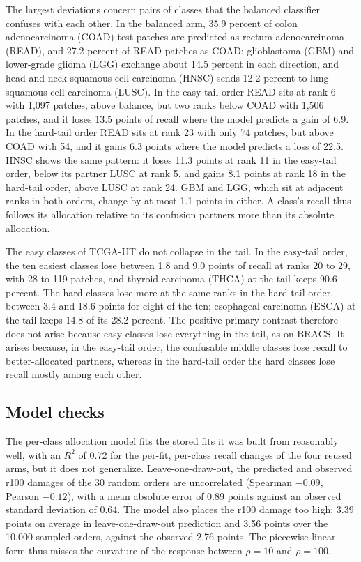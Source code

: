 The largest deviations concern pairs of classes that the balanced classifier confuses with each other. In the balanced arm, 35.9 percent of colon adenocarcinoma (COAD) test patches are predicted as rectum adenocarcinoma (READ), and 27.2 percent of READ patches as COAD; glioblastoma (GBM) and lower-grade glioma (LGG) exchange about 14.5 percent in each direction, and head and neck squamous cell carcinoma (HNSC) sends 12.2 percent to lung squamous cell carcinoma (LUSC). In the easy-tail order READ sits at rank 6 with 1,097 patches, above balance, but two ranks below COAD with 1,506 patches, and it loses 13.5 points of recall where the model predicts a gain of 6.9. In the hard-tail order READ sits at rank 23 with only 74 patches, but above COAD with 54, and it gains 6.3 points where the model predicts a loss of 22.5. HNSC shows the same pattern: it loses 11.3 points at rank 11 in the easy-tail order, below its partner LUSC at rank 5, and gains 8.1 points at rank 18 in the hard-tail order, above LUSC at rank 24. GBM and LGG, which sit at adjacent ranks in both orders, change by at most 1.1 points in either. A class's recall thus follows its allocation relative to its confusion partners more than its absolute allocation.

The easy classes of TCGA-UT do not collapse in the tail. In the easy-tail order, the ten easiest classes lose between 1.8 and 9.0 points of recall at ranks 20 to 29, with 28 to 119 patches, and thyroid carcinoma (THCA) at the tail keeps 90.6 percent. The hard classes lose more at the same ranks in the hard-tail order, between 3.4 and 18.6 points for eight of the ten; esophageal carcinoma (ESCA) at the tail keeps 14.8 of its 28.2 percent. The positive primary contrast therefore does not arise because easy classes lose everything in the tail, as on BRACS. It arises because, in the easy-tail order, the confusable middle classes lose recall to better-allocated partners, whereas in the hard-tail order the hard classes lose recall mostly among each other.

\subsection{Model checks}
\label{sec:model-results}
The per-class allocation model fits the stored fits it was built from reasonably well, with an $R^2$ of 0.72 for the per-fit, per-class recall changes of the four reused arms, but it does not generalize. Leave-one-draw-out, the predicted and observed r100 damages of the 30 random orders are uncorrelated (Spearman $-0.09$, Pearson $-0.12$), with a mean absolute error of 0.89 points against an observed standard deviation of 0.64. The model also places the r100 damage too high: 3.39 points on average in leave-one-draw-out prediction and 3.56 points over the 10,000 sampled orders, against the observed 2.76 points. The piecewise-linear form thus misses the curvature of the response between $\rho=10$ and $\rho=100$.

